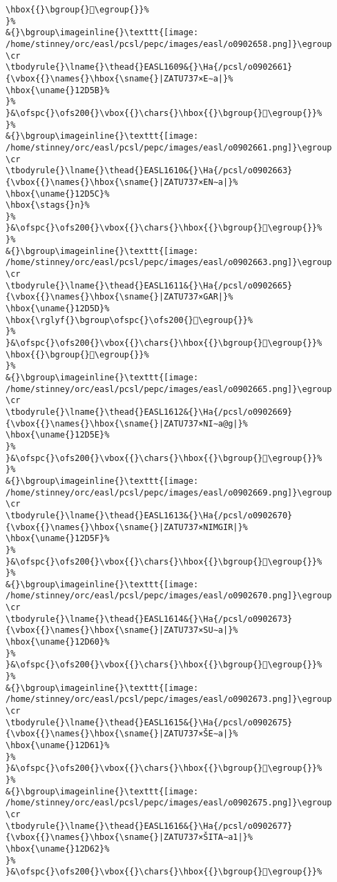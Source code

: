 \begin{verbatim}
\hbox{{}\bgroup{}𒵨\egroup{}}%
}%
&{}\bgroup\imageinline{}\texttt{[image: /home/stinney/orc/easl/pcsl/pepc/images/easl/o0902658.png]}\egroup
\cr
\tbodyrule{}\lname{}\thead{}EASL1609&{}\Ha{/pcsl/o0902661}{\vbox{{}\names{}\hbox{\sname{}|ZATU737×E∼a|}%
\hbox{\uname{}12D5B}%
}%
}&\ofspc{}\ofs200{}\vbox{{}\chars{}\hbox{{}\bgroup{}𒵛\egroup{}}%
}%
&{}\bgroup\imageinline{}\texttt{[image: /home/stinney/orc/easl/pcsl/pepc/images/easl/o0902661.png]}\egroup
\cr
\tbodyrule{}\lname{}\thead{}EASL1610&{}\Ha{/pcsl/o0902663}{\vbox{{}\names{}\hbox{\sname{}|ZATU737×EN∼a|}%
\hbox{\uname{}12D5C}%
\hbox{\stags{}n}%
}%
}&\ofspc{}\ofs200{}\vbox{{}\chars{}\hbox{{}\bgroup{}𒵜\egroup{}}%
}%
&{}\bgroup\imageinline{}\texttt{[image: /home/stinney/orc/easl/pcsl/pepc/images/easl/o0902663.png]}\egroup
\cr
\tbodyrule{}\lname{}\thead{}EASL1611&{}\Ha{/pcsl/o0902665}{\vbox{{}\names{}\hbox{\sname{}|ZATU737×GAR|}%
\hbox{\uname{}12D5D}%
\hbox{\rglyf{}\bgroup\ofspc{}\ofs200{}𒵝\egroup{}}%
}%
}&\ofspc{}\ofs200{}\vbox{{}\chars{}\hbox{{}\bgroup{}𒵝\egroup{}}%
\hbox{{}\bgroup{}𒵦\egroup{}}%
}%
&{}\bgroup\imageinline{}\texttt{[image: /home/stinney/orc/easl/pcsl/pepc/images/easl/o0902665.png]}\egroup
\cr
\tbodyrule{}\lname{}\thead{}EASL1612&{}\Ha{/pcsl/o0902669}{\vbox{{}\names{}\hbox{\sname{}|ZATU737×NI∼a@g|}%
\hbox{\uname{}12D5E}%
}%
}&\ofspc{}\ofs200{}\vbox{{}\chars{}\hbox{{}\bgroup{}𒵞\egroup{}}%
}%
&{}\bgroup\imageinline{}\texttt{[image: /home/stinney/orc/easl/pcsl/pepc/images/easl/o0902669.png]}\egroup
\cr
\tbodyrule{}\lname{}\thead{}EASL1613&{}\Ha{/pcsl/o0902670}{\vbox{{}\names{}\hbox{\sname{}|ZATU737×NIMGIR|}%
\hbox{\uname{}12D5F}%
}%
}&\ofspc{}\ofs200{}\vbox{{}\chars{}\hbox{{}\bgroup{}𒵟\egroup{}}%
}%
&{}\bgroup\imageinline{}\texttt{[image: /home/stinney/orc/easl/pcsl/pepc/images/easl/o0902670.png]}\egroup
\cr
\tbodyrule{}\lname{}\thead{}EASL1614&{}\Ha{/pcsl/o0902673}{\vbox{{}\names{}\hbox{\sname{}|ZATU737×SU∼a|}%
\hbox{\uname{}12D60}%
}%
}&\ofspc{}\ofs200{}\vbox{{}\chars{}\hbox{{}\bgroup{}𒵠\egroup{}}%
}%
&{}\bgroup\imageinline{}\texttt{[image: /home/stinney/orc/easl/pcsl/pepc/images/easl/o0902673.png]}\egroup
\cr
\tbodyrule{}\lname{}\thead{}EASL1615&{}\Ha{/pcsl/o0902675}{\vbox{{}\names{}\hbox{\sname{}|ZATU737×ŠE∼a|}%
\hbox{\uname{}12D61}%
}%
}&\ofspc{}\ofs200{}\vbox{{}\chars{}\hbox{{}\bgroup{}𒵡\egroup{}}%
}%
&{}\bgroup\imageinline{}\texttt{[image: /home/stinney/orc/easl/pcsl/pepc/images/easl/o0902675.png]}\egroup
\cr
\tbodyrule{}\lname{}\thead{}EASL1616&{}\Ha{/pcsl/o0902677}{\vbox{{}\names{}\hbox{\sname{}|ZATU737×ŠITA∼a1|}%
\hbox{\uname{}12D62}%
}%
}&\ofspc{}\ofs200{}\vbox{{}\chars{}\hbox{{}\bgroup{}𒵢\egroup{}}%

\end{verbatim}
